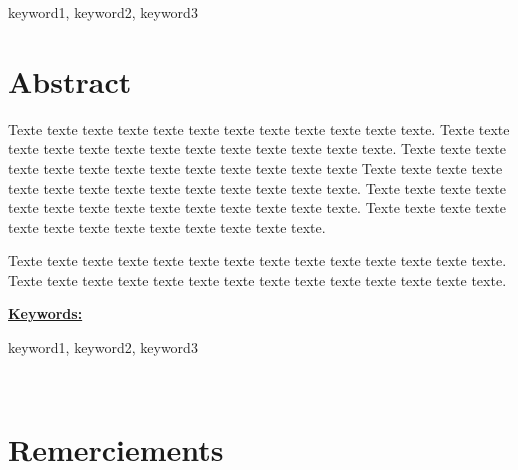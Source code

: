 \documentclass[UTF8,a4paper,12pt]{ctexart}
\begin{document}
keyword1, keyword2, keyword3

\vfill

\section*{Abstract}

\hspace{8mm} Texte texte texte texte texte texte texte texte texte texte texte texte. Texte texte texte texte texte texte texte texte texte texte texte texte texte. Texte texte texte texte texte texte texte texte texte texte texte texte texte Texte texte texte texte texte texte texte texte texte texte texte texte texte texte. Texte texte texte texte texte texte texte texte texte texte texte texte texte texte. Texte texte texte texte texte texte texte texte texte texte texte texte texte.

\hspace{8mm} Texte texte texte texte texte texte texte texte texte texte texte texte texte texte. Texte texte texte texte texte texte texte texte texte texte texte texte texte texte.

\vspace{0.3cm}
\textbf{\underline{Keywords: }}

keyword1, keyword2, keyword3

\vfill

\newpage

~\newpage
\section*{Remerciements}
\lipsum[1]
\newpage

\raggedright
\renewcommand{\contentsname}{\hfill\bfseries\Large Table des matières\hfill}

{\tableofcontents
\thispagestyle{fancy}
}
\newpage

\renewcommand{\listfigurename}{\hfill\bfseries\Large Table des illustrations\hfill}
\listoffigures
\newpage
\end{document}
